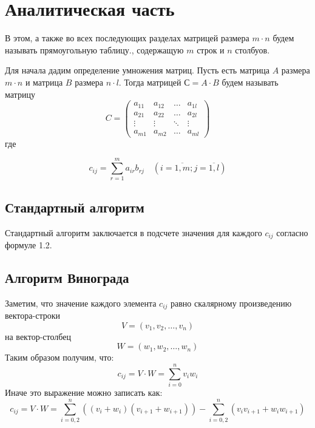 \chapter{Аналитическая часть}

В этом, а также во всех последующих разделах матрицей размера $m \cdot n$ будем называть прямоугольную таблицу., содержащую $m$ строк и $n$ столбуов.

Для начала дадим определение умножения матриц. Пусть есть матрица $A$ размера  $m \cdot n$ и матрица $B$ размера $n \cdot l$. Тогда матрицей $С = A \cdot B$ будем называть матрицу 
\begin{equation}
C = \begin{pmatrix}
	a_{11} & a_{12} & \ldots & a_{1l}\\
	a_{21} & a_{22} & \ldots & a_{2l}\\
	\vdots & \vdots & \ddots & \vdots\\
	a_{m1} & a_{m2} & \ldots & a_{ml}
\end{pmatrix}
\end{equation}
где

\begin{equation}
  \label{eq:mult}
  c_{ij} = \sum_{r=1}^{m} a_{ir}b_{rj} \quad (i=\overline{1,m}; j=\overline{1,l})
\end{equation}

\section{Стандартный алгоритм}


Стандартный алгоритм заключается в подсчете  значения для каждого $c_{ij}$ согласно формуле 1.2.


\section{Алгоритм Винограда}

Заметим, что значение каждого элемента $c_{ij}$ равно скалярному произведению вектора-строки 
\begin{equation}
	V = (v_1, v_2, \ldots, v_n)
\end{equation}
на вектор-столбец
\begin{equation}
	W = (w_1, w_2, \ldots, w_n)
\end{equation}
Таким образом получим, что:
\begin{equation}
	c_{ij} = V \cdot W = \sum_{i=0}^{n} v_iw_i
\end{equation}
Иначе это выражение можно записать как:
\begin{equation}
	\label{eq:sum_1}
	c_{ij} = V \cdot W = \sum_{i=0, 2}^{n} ((v_i + w_i)(v_{i+1} + w_{i+1})) - \sum_{i=0, 2}^{n} (v_{i}v_{i+1} + w_{i}w_{i+1})
\end{equation}

